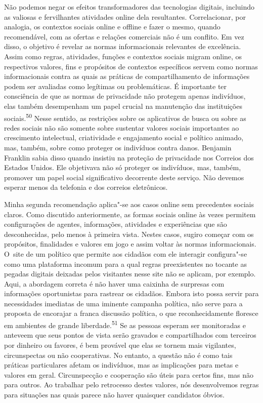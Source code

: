 Não podemos negar os efeitos transformadores das tecnologias digitais,
incluindo as valiosas e fervilhantes atividades online dela resultantes.
Correlacionar, por analogia, os contextos sociais online e offline e
fazer o mesmo, quando recomendável, com as ofertas e relações comerciais
não é um conflito. Em vez disso, o objetivo é revelar as normas
informacionais relevantes de excelência. Assim como regras, atividades,
funções e contextos sociais migram online, os respectivos valores, fins
e propósitos de contextos específicos servem como normas informacionais
contra as quais as práticas de compartilhamento de informações podem ser
avaliadas como legítimas ou problemáticas. É importante ter consciência
de que as normas de privacidade não protegem apenas indivíduos, elas
também desempenham um papel crucial na manutenção das instituições
sociais.\textsuperscript{{50}} Nesse sentido, as restrições sobre os
aplicativos de busca ou sobre as redes sociais não são somente sobre
sustentar valores sociais importantes ao crescimento intelectual,
criatividade e engajamento social e político animado, mas, também, sobre
como proteger os indivíduos contra danos. Benjamin Franklin sabia disso
quando insistiu na proteção de privacidade nos Correios dos Estados
Unidos. Ele objetivava não só proteger os indivíduos, mas, também,
promover um papel social significativo decorrente deste serviço. Não
devemos esperar menos da telefonia e dos correios eletrônicos.

Minha segunda recomendação aplica"-se aos casos online sem precedentes
sociais claros. Como discutido anteriormente, as formas sociais online
às vezes permitem configurações de agentes, informações, atividades e
experiências que são desconhecidas, pelo menos à primeira vista. Nestes
casos, sugiro começar com os propósitos, finalidades e valores em jogo e
assim voltar às normas informacionais. O~site de um político que permite
aos cidadãos com ele interagir configura"-se como uma plataforma incomum
para a qual regras preexistentes no tocante as pegadas digitais deixadas
pelos visitantes nesse site não se aplicam, por exemplo. Aqui, a
abordagem correta é não haver uma caixinha de surpresas com informações
oportunistas para rastrear os cidadãos. Embora isto possa servir para
necessidades imediatas de uma iminente campanha política, não serve para
a proposta de encorajar a franca discussão política, o que
reconhecidamente floresce em ambientes de grande
liberdade.\textsuperscript{{51}} Se as pessoas esperam ser monitoradas e
anteveem que seus pontos de vista serão gravados e compartilhados com
terceiros por dinheiro ou favores, é bem provável que elas se tornem
mais vigilantes, circunspectas ou não cooperativas. No entanto, a
questão não é como tais práticas particulares afetam os indivíduos, mas
as implicações para metas e valores em geral. Circunspecção e cooperação
são úteis para certos fins, mas não para outros. Ao trabalhar pelo
retrocesso destes valores, nós desenvolvemos regras para situações nas
quais parece não haver quaisquer candidatos óbvios.

